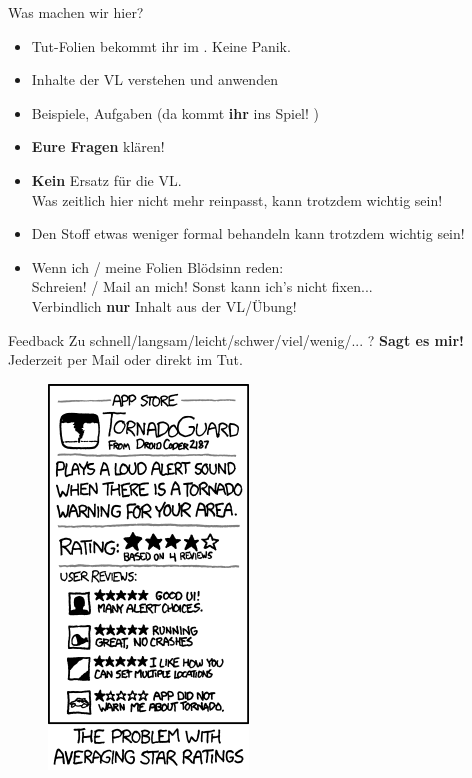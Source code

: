 \begin{frame}[t]{Was machen wir hier?}
	\begin{itemize}[<+->]
		\item Tut-Folien bekommt ihr im \ILIAS. Keine Panik.
		\item Inhalte der VL verstehen und anwenden
		\item Beispiele, Aufgaben (da kommt \textbf{ihr} ins Spiel! \smiley)
		\item \textbf{Eure Fragen} klären! 
		\item \textbf{Kein} Ersatz für die VL. \\
			  Was zeitlich hier nicht mehr reinpasst, kann trotzdem wichtig sein!
	    \item Den Stoff etwas weniger formal behandeln \impl {} kann trotzdem wichtig sein! 
	    \item Wenn ich / meine Folien Blödsinn reden: \\
		      Schreien! / Mail an mich! \impl Sonst kann ich's nicht fixen... \frownie \\
		      Verbindlich \textbf{nur} Inhalt aus der VL/Übung! 
	\end{itemize}
\end{frame}

\begin{frame}{Feedback}
	Zu schnell/langsam/leicht/schwer/viel/wenig/... ? \impl \textbf{Sagt es mir!}\\
	Jederzeit per Mail oder direkt im Tut.
	
	\begin{figure}
		\centering 
		\includegraphics[scale=0.5]{xkcd/tornadoguard_937}
	\end{figure}
	
\end{frame}

